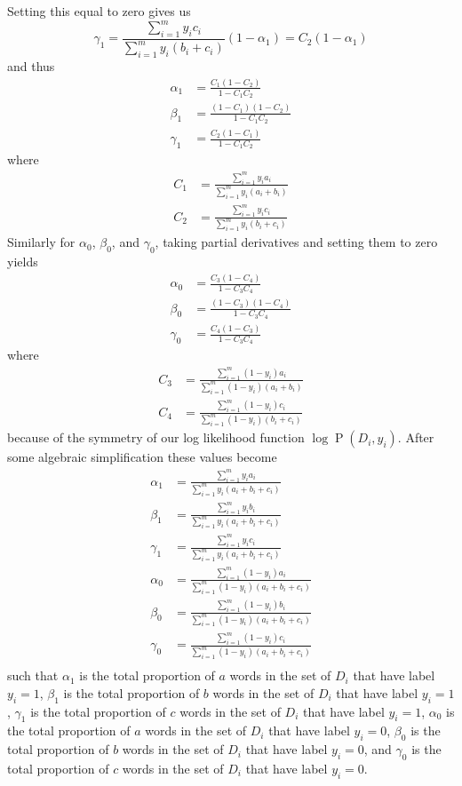\documentclass[12pt]{article}
\begin{document}
Setting this equal to zero gives us
\[\gamma_1=\frac{\sum_{i=1}^m y_ic_i}{\sum_{i=1}^m y_i(b_i+c_i)}(1-\alpha_1)=C_2(1-\alpha_1)\]
and thus
\begin{align*}
        \alpha_1&=\frac{C_1(1-C_2)}{1-C_1C_2}\\
        \beta_1&=\frac{(1-C_1)(1-C_2)}{1-C_1C_2}\\
        \gamma_1&=\frac{C_2(1-C_1)}{1-C_1C_2}
\end{align*}
where
\begin{align*}
        C_1&=\frac{\sum_{i=1}^m y_ia_i}{\sum_{i=1}^m y_i(a_i+b_i)}\\
        C_2&=\frac{\sum_{i=1}^m y_ic_i}{\sum_{i=1}^m y_i(b_i+c_i)}
\end{align*}
Similarly for \(\alpha_0\), \(\beta_0\), and \(\gamma_0\), taking partial derivatives and setting them to zero yields
\begin{align*}
        \alpha_0&=\frac{C_3(1-C_4)}{1-C_3C_4}\\
        \beta_0&=\frac{(1-C_3)(1-C_4)}{1-C_3C_4}\\
        \gamma_0&=\frac{C_4(1-C_3)}{1-C_3C_4}
\end{align*}
where
\begin{align*}
        C_3&=\frac{\sum_{i=1}^m (1-y_i)a_i}{\sum_{i=1}^m (1-y_i)(a_i+b_i)}\\
        C_4&=\frac{\sum_{i=1}^m (1-y_i)c_i}{\sum_{i=1}^m (1-y_i)(b_i+c_i)}
\end{align*}
because of the symmetry of our log likelihood function \(\log \operatorname{P}(D_i, y_i)\). After some algebraic simplification
these values become
\begin{align*}
        \alpha_1&=\frac{\sum_{i=1}^m y_ia_i}{\sum_{i=1}^m y_i(a_i+b_i+c_i)}\\
        \beta_1&=\frac{\sum_{i=1}^m y_ib_i}{\sum_{i=1}^m y_i(a_i+b_i+c_i)}\\
        \gamma_1&=\frac{\sum_{i=1}^m y_ic_i}{\sum_{i=1}^m y_i(a_i+b_i+c_i)}\\
        \alpha_0&=\frac{\sum_{i=1}^m (1-y_i)a_i}{\sum_{i=1}^m (1-y_i)(a_i+b_i+c_i)}\\
        \beta_0&=\frac{\sum_{i=1}^m (1-y_i)b_i}{\sum_{i=1}^m (1-y_i)(a_i+b_i+c_i)}\\
        \gamma_0&=\frac{\sum_{i=1}^m (1-y_i)c_i}{\sum_{i=1}^m (1-y_i)(a_i+b_i+c_i)}\\
\end{align*}
such that \(\alpha_1\) is the total proportion of \(a\) words in the set of \(D_i\) that have label \(y_i=1\), \(\beta_1\) is the total
proportion of \(b\) words in the set of \(D_i\) that have label \(y_i=1\), \(\gamma_1\) is the total proportion of \(c\) words in the set
of \(D_i\) that have label \(y_i=1\), \(\alpha_0\) is the total proportion of \(a\) words in the set of \(D_i\) that have label \(y_i=0\),
\(\beta_0\) is the total proportion of \(b\) words in the set of \(D_i\) that have label \(y_i=0\), and
\(\gamma_0\) is the total proportion of \(c\) words in the set of \(D_i\) that have label \(y_i=0\).
\end{document}
